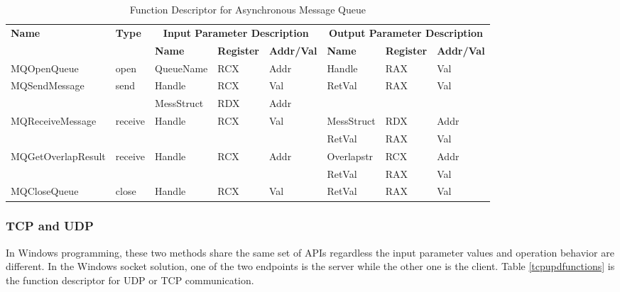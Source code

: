 \begin{table}[H]
  \centering
  \caption{Function Descriptor for Asynchronous Message Queue}
  \label{msmqasynfunctions}
\begin{tabular}{|l|l|l|l|l|l|l|l|}
\hline
             \multirow{2}{*}{{\textbf{Name}}} & \multirow{2}{*}{{\textbf{Type}}} & \multicolumn{3}{c|}{\textbf{Input Parameter Description}} & \multicolumn{3}{c|}{\textbf{Output Parameter Description}} \\
              \cline{3-8} 
             & & \textbf{Name}& \textbf{Register} & \textbf{Addr/Val} & \textbf{Name}& \textbf{Register} &  \textbf{Addr/Val}  \\
             \hline
      MQOpenQueue
       &open & QueueName & RCX  & Addr &  Handle & RAX & Val\\
      \hline                     
      \multirow{2}{*}{MQSendMessage}
       &\multirow{2}{*}{send} &  Handle & RCX & Val & \multirow{2}{*}{RetVal} & \multirow{2}{*}{RAX}  & \multirow{2}{*}{Val} \\
       \cline{3-5}
      & & MessStruct& RDX&Addr &   &  &  \\
      \hline            
           \multirow{2}{*}{MQReceiveMessage}
       &\multirow{2}{*}{receive}&  \multirow{2}{*}{Handle} & \multirow{2}{*}{RCX} & \multirow{2}{*}{Val}& MessStruct& RDX&Addr\\
              \cline{6-8}
      & & & & & RetVal & RAX & Val\\
      \hline    
      \multirow{2}{*}{MQGetOverlapResult} &
       \multirow{2}{*}{receive} &  \multirow{2}{*}{Handle} & \multirow{2}{*}{RCX} & \multirow{2}{*}{Addr} & Overlapstr& RCX&Addr\\
                     \cline{6-8}
      & & & & & RetVal & RAX & Val\\
      \hline      
      MQCloseQueue &
       close &  Handle & RCX & Val & RetVal & RAX & Val\\
      \hline                          
  \end{tabular}   
\end{table}


    
\subsubsection{TCP and UDP}
In Windows programming, these two methods share the same set of APIs regardless the input parameter values and operation behavior are different. In the Windows socket solution, one of the two endpoints is the server while the other one is the client. Table \ref{tcpupdfunctions} is the function descriptor for UDP or TCP communication. 

